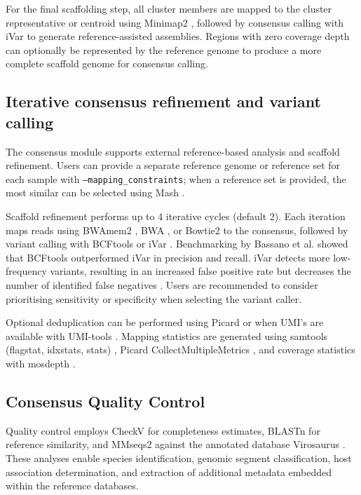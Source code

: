 For the final scaffolding step, all cluster members are mapped to the cluster representative or centroid using Minimap2 \cite{Li2018-gi}, followed by consensus calling with iVar \cite{Grubaugh2019-xd} to generate reference-assisted assemblies. Regions with zero coverage depth can optionally be represented by the reference genome to produce a more complete scaffold genome for consensus calling.

\subsection{Iterative consensus refinement and variant calling}

The consensus module supports external reference-based analysis and scaffold refinement. Users can provide a separate reference genome or reference set for each sample with \texttt{--mapping\_constraints}; when a reference set is provided, the most similar can be selected using Mash \cite{Ondov2019-bo}.

Scaffold refinement performs up to 4 iterative cycles (default 2). Each iteration maps reads using BWAmem2 \cite{Vasimuddin2019-rb}, BWA \cite{Li2013-pp}, or Bowtie2 \cite{Langmead2019-wx} to the consensus, followed by variant calling with BCFtools \cite{Danecek2021-je} or iVar \cite{Grubaugh2019-xd}. Benchmarking by Bassano et al. \cite{Bassano2022-cl} showed that BCFtools outperformed iVar in precision and recall. iVar detects more low-frequency variants, resulting in an increased false positive rate but decreases the number of identified false negatives \cite{Bassano2022-cl}. Users are recommended to consider prioritising sensitivity or specificity when selecting the variant caller.

Optional deduplication can be performed using Picard or when UMI’s are available with UMI-tools \cite{Smith2017-nk}. Mapping statistics are generated using samtools (flagstat, idxstats, stats) \cite{Danecek2021-je}, Picard CollectMultipleMetrics \cite{Broad-Institute2019-rv}, and coverage statistics with mosdepth \cite{Pedersen2018-mu}.

\subsection{Consensus Quality Control}

Quality control employs CheckV \cite{Nayfach2021-wl} for completeness estimates, BLASTn \cite{Altschul1990-sy} for reference similarity, and MMseqs2 \cite{Steinegger2017-ci} against the annotated database Virosaurus \cite{Gleizes2020-rq}. These analyses enable species identification, genomic segment classification, host association determination, and extraction of additional metadata embedded within the reference databases.

